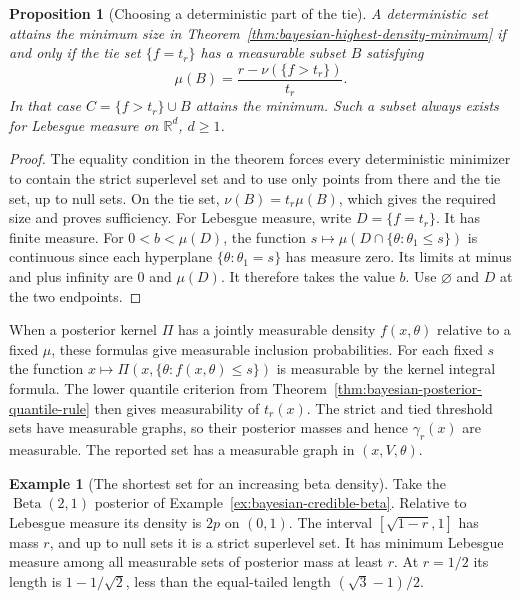 \documentclass[11pt,oneside]{book}
\newtheorem{proposition}[theorem]{Proposition}
\theoremstyle{definition}
\newtheorem{example}[theorem]{Example}
\theoremstyle{remark}
\newcommand{\R}{\mathbb R}
\begin{document}
\begin{proposition}[Choosing a deterministic part of the tie]
\label{prop:bayesian-highest-density-deterministic}
A deterministic set attains the minimum size in
Theorem~\ref{thm:bayesian-highest-density-minimum} if and only if
the tie set $\{f=t_r\}$ has a measurable subset $B$ satisfying
\[
\mu(B)=\frac{r-\nu(\{f>t_r\})}{t_r}.
\]
In that case $C=\{f>t_r\}\cup B$ attains the minimum. Such a subset
always exists for Lebesgue measure on $\R^d$, $d\geq1$.
\end{proposition}
\begin{proof}
The equality condition in the theorem forces every deterministic
minimizer to contain the strict superlevel set and to use only
points from there and the tie set, up to null sets. On the tie set,
$\nu(B)=t_r\mu(B)$, which gives the required size and proves
sufficiency. For Lebesgue measure, write $D=\{f=t_r\}$. It has
finite measure. For $0<b<\mu(D)$, the function
$s\mapsto\mu(D\cap\{\theta:\theta_1\leq s\})$ is continuous since
each hyperplane $\{\theta:\theta_1=s\}$ has measure zero.
Its limits at minus and plus infinity are $0$ and $\mu(D)$.
It therefore takes the value $b$. Use $\varnothing$ and $D$ at
the two endpoints.
\end{proof}

When a posterior kernel $\Pi$ has a jointly measurable density
$f(x,\theta)$ relative to a fixed $\mu$, these formulas give
measurable inclusion probabilities. For each fixed $s$ the
function $x\mapsto\Pi(x,\{\theta:f(x,\theta)\leq s\})$ is
measurable by the kernel integral formula. The lower quantile
criterion from Theorem~\ref{thm:bayesian-posterior-quantile-rule}
then gives measurability of $t_r(x)$. The strict and tied
threshold sets have measurable graphs, so their posterior masses
and hence $\gamma_r(x)$ are measurable. The reported set has a measurable graph in $(x,V,\theta)$.

\begin{example}[The shortest set for an increasing beta density]
\label{ex:bayesian-hpd-beta}
Take the $\operatorname{Beta}(2,1)$ posterior of
Example~\ref{ex:bayesian-credible-beta}. Relative to Lebesgue measure
its density is $2p$ on $(0,1)$. The interval
$[\sqrt{1-r},1]$ has mass $r$, and up to null sets it is a
strict superlevel set. It has minimum Lebesgue measure among all
measurable sets of posterior mass at least $r$. At $r=1/2$ its
length is $1-1/\sqrt2$, less than the equal-tailed length
$(\sqrt3-1)/2$.
\end{example}
\end{document}
